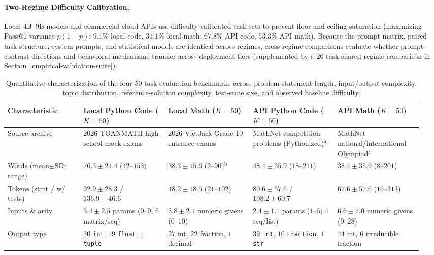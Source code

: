 \documentclass[a4paper,fleqn]{cas-sc}
\begin{document}
\paragraph{Two-Regime Difficulty Calibration.}
Local 4B--9B models and commercial cloud APIs use difficulty-calibrated task sets to prevent floor and ceiling saturation (maximizing Pass@1 variance $p(1-p)$: $9.1\%$ local code, $31.1\%$ local math; $67.8\%$ API code, $53.3\%$ API math). Because the prompt matrix, paired task structure, system prompts, and statistical models are identical across regimes, cross-regime comparisons evaluate whether prompt-contrast directions and behavioral mechanisms transfer across deployment tiers (supplemented by a 20-task shared-regime comparison in Section~\ref{empirical-validation-suite}).

\begin{table}[htbp]
\centering
\caption{Quantitative characterization of the four 50-task evaluation benchmarks across problem-statement length, input/output complexity, topic distribution, reference-solution complexity, test-suite size, and observed baseline difficulty.}\label{tab:task-dataset-characterization}
\scriptsize
\setlength{\tabcolsep}{3pt}
\begin{tabular}{@{}p{0.17\linewidth}p{0.195\linewidth}p{0.195\linewidth}p{0.195\linewidth}p{0.195\linewidth}@{}}
\toprule
\textbf{Characteristic} & \textbf{Local Python Code ($K = 50$)} & \textbf{Local Math ($K = 50$)} & \textbf{API Python Code ($K = 50$)} & \textbf{API Math ($K = 50$)} \\
\midrule
Source archive & 2026 TOANMATH high-school mock exams & 2026 VietJack Grade-10 entrance exams & MathNet competition problems (Pythonized)$^{\text{a}}$ & MathNet national/international Olympiad$^{\text{a}}$ \\
Words (mean$\pm$SD; range) & $76.3 \pm 21.4$ ($42$--$153$) & $38.3 \pm 15.6$ ($2$--$90$)$^{\text{b}}$ & $48.4 \pm 35.9$ ($18$--$211$) & $38.4 \pm 35.9$ ($8$--$201$) \\
Tokens (stmt / w/ tests) & $92.9 \pm 28.3$ / $136.9 \pm 46.6$ & $48.2 \pm 18.5$ ($21$--$102$) & $80.6 \pm 57.6$ / $108.2 \pm 60.7$ & $67.6 \pm 57.6$ ($16$--$313$) \\
Inputs \& arity & $3.4 \pm 2.5$ params ($0$--$9$; $6$ matrix/seq) & $3.8 \pm 2.1$ numeric givens ($0$--$10$) & $2.4 \pm 1.1$ params ($1$--$5$; $4$ seq/list) & $6.6 \pm 7.0$ numeric givens ($0$--$28$) \\
Output type & $30$ \texttt{int}, $19$ \texttt{float}, $1$ \texttt{tuple} & $27$ int, $22$ fraction, $1$ decimal & $39$ \texttt{int}, $10$ \texttt{Fraction}, $1$ \texttt{str} & $44$ int, $6$ irreducible fraction \\

\end{tabular}
\end{table}
\end{document}
